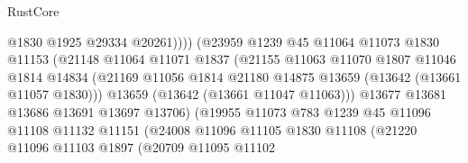 \begin{lexlean}{RustCore}
\begin{coremodule}
                                        @1830
                                        @1925
                                        @29334
                                        @20261))))
                                (@23959
                                  @1239
                                  @45
                                  @11064
                                  @11073
                                  @1830
                                  @11153
                                  (@21148
                                    @11064
                                    @11071
                                    @1837
                                    (@21155
                                      @11063
                                      @11070
                                      @1807
                                      @11046
                                      @1814
                                      @14834
                                      (@21169
                                        @11056
                                        @1814
                                        @21180
                                        @14875
                                        @13659
                                        (@13642 (@13661 @11057 @1830)))
                                      @13659
                                      (@13642 (@13661 @11047 @11063)))
                                    @13677
                                    @13681
                                    @13686
                                    @13691
                                    @13697
                                    @13706)
                                  (@19955
                                    @11073
                                    @783
                                    @1239
                                    @45
                                    @11096
                                    @11108
                                    @11132
                                    @11151
                                    (@24008
                                      @11096
                                      @11105
                                      @1830
                                      @11108
                                      (@21220
                                        @11096
                                        @11103
                                        @1897
                                        (@20709
                                          @11095
                                          @11102

\end{coremodule}
\end{lexlean}
